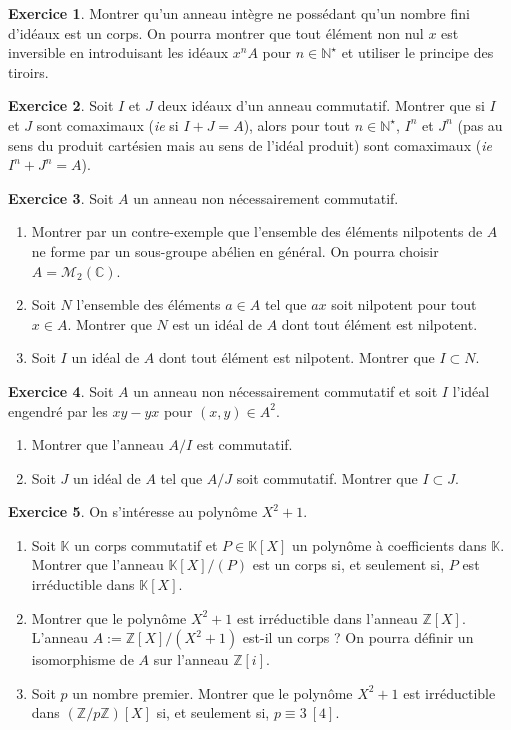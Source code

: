 \documentclass[french]{book}
\newcommand{\N}{\mathbb{N}}
\newcommand{\Z}{\mathbb{Z}}
\newcommand{\C}{\mathbb{C}}
\newcommand{\K}{\mathbb{K}}
\newcommand{\st}{^\star}
\theoremstyle{plain}
\theoremstyle{definition}
\newtheorem{exe}{Exercice}[chapter]
\theoremstyle{remark}
\begin{document}
\begin{exe}
	Montrer qu'un anneau intègre ne possédant qu'un nombre fini d'idéaux est un corps. On pourra montrer que tout élément non nul $x$ est inversible en introduisant les idéaux $x^nA$ pour $n\in\N\st$ et utiliser le principe des tiroirs.
\end{exe}
\begin{exe}
	Soit $I$ et $J$ deux idéaux d'un anneau commutatif. Montrer que si $I$ et $J$ sont comaximaux (\textit{ie} si $I+J=A$), alors pour tout $n\in\N\st$, $I^n$ et $J^n$ (pas au sens du produit cartésien mais au sens de l'idéal produit) sont comaximaux (\textit{ie} $I^n+J^n=A$).
\end{exe}
\begin{exe}
	Soit $A$ un anneau non nécessairement commutatif.
	\begin{enumerate}
		\item Montrer par un contre-exemple que l'ensemble des éléments nilpotents de $A$ ne forme par un sous-groupe abélien en général. On pourra choisir $A=\mathcal{M}_2(\C)$.
		\item Soit $N$ l'ensemble des éléments $a\in A$ tel que $ax$ soit nilpotent pour tout $x\in A$. Montrer que $N$ est un idéal de $A$ dont tout élément est nilpotent.
		\item Soit $I$ un idéal de $A$ dont tout élément est nilpotent. Montrer que $I\subset N$.
	\end{enumerate}
\end{exe}
\begin{exe}
	Soit $A$ un anneau non nécessairement commutatif et soit $I$ l'idéal engendré par les $xy-yx$ pour $(x,y)\in A^2$.
	\begin{enumerate}
		\item Montrer que l'anneau $A/I$ est commutatif.
		\item Soit $J$ un idéal de $A$ tel que $A/J$ soit commutatif. Montrer que $I\subset J$.
	\end{enumerate}
\end{exe}
\begin{exe}
	 On s'intéresse au polynôme $X^2+1$.
	\begin{enumerate}
		\item Soit $\K$ un corps commutatif et $P\in\K[X]$ un polynôme à coefficients dans $\K$. Montrer que l'anneau $\K[X]/(P)$ est un corps si, et seulement si, $P$ est irréductible dans $\K[X]$.
		\item Montrer que le polynôme $X^2+1$ est irréductible dans l'anneau $\Z[X]$. L'anneau $A:=\Z[X]/(X^2+1)$ est-il un corps ? On pourra définir un isomorphisme de $A$ sur l'anneau $\Z[i]$.
		\item Soit $p$ un nombre premier. Montrer que le polynôme $X^2+1$ est irréductible dans $(\Z/p\Z)[X]$ si, et seulement si, $p\equiv3\ [4]$.
	\end{enumerate}
\end{exe}
\end{document}
